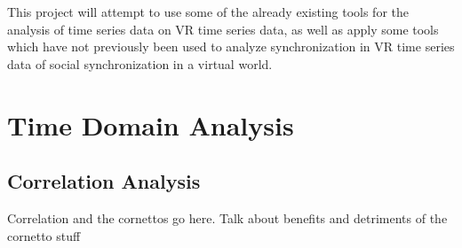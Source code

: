 \documentclass[12pt]{article}
\begin{document}

This project will attempt to use some of the already existing tools for the analysis of time series data on VR time series data, as well as apply some tools which have not previously been used to analyze synchronization in VR time series data of social synchronization in a virtual world.




\section{Time Domain Analysis}

\subsection{Correlation Analysis}




Correlation and the cornettos go here. Talk about benefits and detriments of the cornetto stuff

\end{document}
